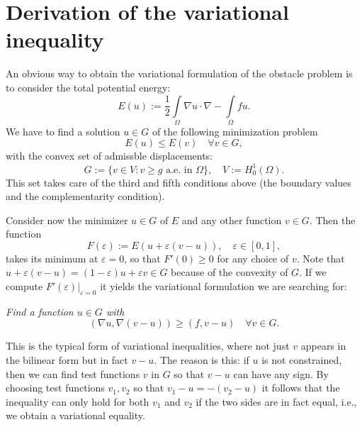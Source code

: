 \documentclass{article}
\begin{document}
\section{Derivation of the variational inequality}

An obvious way to obtain the variational formulation of the obstacle problem is to consider the total potential energy:
\begin{equation*}
 E(u):=\dfrac{1}{2}\int\limits_{\Omega} \nabla u \cdot \nabla - \int\limits_{\Omega} fu.
\end{equation*}
We have to find a solution $u\in G$ of the following minimization problem
\begin{equation*}
 E(u)\leq E(v)\quad \forall v\in G,
\end{equation*}
with the convex set of admissble displacements:
\begin{equation*}
 G:=\lbrace v\in V: v\geq g \text{ a.e. in } \Omega\rbrace,\quad V:=H^1_0(\Omega).
\end{equation*}
This set takes care of the third and fifth conditions above (the boundary
values and the complementarity condition).

Consider now the minimizer $u\in G$ of $E$ and any other function $v\in
G$. Then the function
\begin{equation*}
 F(\varepsilon) := E(u+\varepsilon(v-u)),\quad\varepsilon\in\left[0,1\right],
\end{equation*}
takes its minimum at $\varepsilon = 0$, so that $F'(0)\geq 0$ for any choice
of $v$. Note that
$u+\varepsilon(v-u) = (1-\varepsilon)u+\varepsilon v\in G$ because of the
convexity of $G$. If we compute $F'(\varepsilon)\vert_{\varepsilon=0}$ it
yields the variational formulation we are searching for:

\textit{Find a function $u\in G$ with}
\begin{equation*}
 \left(\nabla u, \nabla(v-u)\right) \geq \left(f,v-u\right) \quad \forall v\in G.
\end{equation*}

This is the typical form of variational inequalities, where not just $v$
appears in the bilinear form but in fact $v-u$. The reason is this: if $u$ is
not constrained, then we can find test functions $v$ in $G$ so that $v-u$ can have
any sign. By choosing test functions $v_1,v_2$ so that $v_1-u = -(v_2-u)$ it
follows that the inequality can only hold for both $v_1$ and $v_2$ if the two
sides are in fact equal, i.e., we obtain a variational equality.
\end{document}

